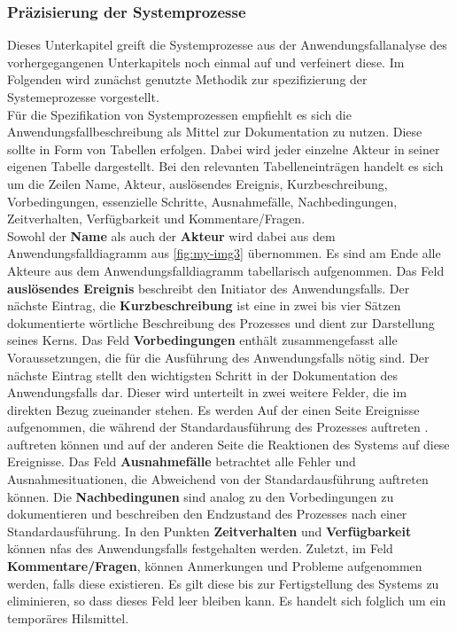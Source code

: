 \documentclass[../Bachelorarbeit.tex]{subfiles}
\begin{document}
\subsubsection{Präzisierung der Systemprozesse} \label{AnwfallSpezPraez}
Dieses Unterkapitel greift die Systemprozesse aus der Anwendungsfallanalyse des vorhergegangenen Unterkapitels noch einmal auf und verfeinert diese. Im Folgenden wird zunächst genutzte Methodik zur spezifizierung der Systemeprozesse vorgestellt.\\
Für die Spezifikation von Systemprozessen empfiehlt es sich die Anwendungsfallbeschreibung als Mittel zur Dokumentation zu nutzen. Diese sollte in Form von Tabellen erfolgen. Dabei wird jeder einzelne Akteur in seiner eigenen Tabelle dargestellt. Bei den relevanten Tabelleneinträgen handelt es sich um die Zeilen Name, Akteur, auslösendes Ereignis, Kurzbeschreibung, Vorbedingungen, essenzielle Schritte, Ausnahmefälle, Nachbedingungen, Zeitverhalten, Verfügbarkeit und Kommentare/Fragen.\\ %
Sowohl der \textbf{Name} als auch der \textbf{Akteur} wird dabei aus dem Anwendungsfalldiagramm aus \autoref{fig:my-img3} übernommen. Es sind am Ende alle Akteure aus dem Anwendungsfalldiagramm tabellarisch aufgenommen. Das Feld \textbf{auslösendes Ereignis} beschreibt den Initiator des Anwendungsfalls. Der nächste Eintrag, die \textbf{Kurzbeschreibung} ist eine in zwei bis vier Sätzen dokumentierte wörtliche Beschreibung des Prozesses und dient zur Darstellung seines Kerns. Das Feld \textbf{Vorbedingungen} enthält zusammengefasst alle Voraussetzungen, die für die Ausführung des Anwendungsfalls nötig sind. Der nächste Eintrag stellt den wichtigsten Schritt in der Dokumentation des Anwendungsfalls dar. Dieser wird unterteilt in zwei weitere Felder, die im direkten Bezug zueinander stehen. Es werden Auf der einen Seite Ereignisse aufgenommen, die während der Standardausführung des Prozesses auftreten \bzw. auftreten können und auf der anderen Seite die Reaktionen des Systems auf diese Ereignisse. Das Feld \textbf{Ausnahmefälle} betrachtet alle Fehler und Ausnahmesituationen, die Abweichend von der Standardausführung auftreten können. Die \textbf{Nachbedingunen} sind analog zu den Vorbedingungen zu dokumentieren und beschreiben den Endzustand des Prozesses nach einer Standardausführung. In den Punkten \textbf{Zeitverhalten} und \textbf{Verfügbarkeit} können \acp{nfa} des Anwendungsfalls festgehalten werden. Zuletzt, im Feld \textbf{Kommentare/Fragen}, können Anmerkungen und Probleme aufgenommen werden, falls diese existieren. Es gilt diese bis zur Fertigstellung des Systems zu eliminieren, so dass dieses Feld leer bleiben kann. Es handelt sich folglich um ein temporäres Hilsmittel.\\
\end{document}
